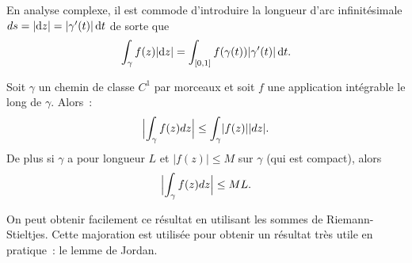 En analyse complexe, il est commode d'introduire la longueur d'arc infinitésimale $ds = \lvert \mathop{}\mathopen{}\mathrm{d} z \rvert =\lvert\gamma^\prime(t)\rvert\mathop{}\mathopen{}\mathrm{d} t$ de sorte que
\[\int_ \gamma f(z) \lvert \mathop{}\mathopen{}\mathrm{d} z \rvert = \int_{[0,1]} f(\gamma(t)) \lvert\gamma^\prime(t)\rvert \mathop{}\mathopen{}\mathrm{d} t .\]
\begin{fprop}
Soit $\gamma$ un chemin de classe $C^1$ par morceaux et soit $f$ une application  intégrable le long de $\gamma$. Alors~:
\[
\Bigl \lvert\int_{\gamma} f(z) dz\Bigr \rvert \leq \int_{\gamma} \lvert f(z) \rvert \lvert dz \rvert.
\]
De plus si $\gamma$ a pour longueur $L$ et $\lvert f(z) \rvert \leq M$ sur $\gamma$ (qui est compact), alors
\[
\Bigl \lvert\int_{\gamma} f(z) dz\Bigr \rvert \leq M L.
\]
\end{fprop}
On peut obtenir facilement ce résultat en utilisant les sommes de Riemann-Stieltjes.
Cette majoration est utilisée pour obtenir un résultat très utile en
pratique~: le lemme de Jordan.


